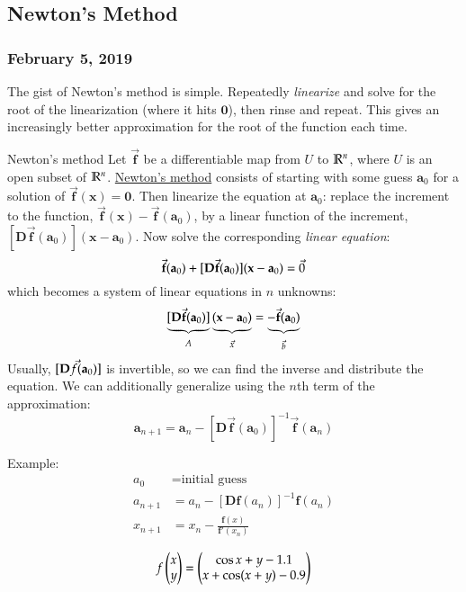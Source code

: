 \newpage
\subsection{Newton's Method}
\subsubsection*{February 5, 2019}

The gist of Newton's method is simple. Repeatedly \emph{linearize} and solve for the root of the linearization (where it hits $\bm{0}$), then rinse and repeat. This gives an increasingly better approximation for the root of the function each time. 

\begin{defn}{Newton's method}
Let $\vec{\bm{f}}$ be a differentiable map from $U$ to $\mathbb{R}^n$, where $U$ is an open subset of $\mathbb{R}^n$. \ul{Newton's method} consists of starting with some guess $\bm{a}_0$ for a solution of $\vec{\bm{f}}(\bm{x})=\bm{0}$. Then linearize the equation at $\bm{a}_0$: replace the increment to the function, $\vec{\bm{f}}(\bm{x})-\vec{\bm{f}}(\bm{a}_0)$, by a linear function of the increment, $[\bm{D}\vec{\bm{f}}(\bm{a}_0)](\bm{x}-\bm{a}_0)$. Now solve the corresponding \emph{linear equation}:
  \begin{equation}
  	\vec{\textbf{f}}(\textbf{a}_0)+[\textbf{D}\vec{\textbf{f}}(\textbf{a}_0)](\textbf{x}-\textbf{a}_0)=\Vec{0}
  \end{equation}
  which becomes a system of linear equations in $n$ unknowns: 
  \begin{equation}
  	\underbrace{[\textbf{D\ensuremath{\Vec{\textbf{f}}}}(\textbf{a}_0)]}_{A}\underbrace{(\textbf{x}-\textbf{a}_0)}_{\Vec{x}}=\underbrace{-\vec{\textbf{f}}(\textbf{a}_0)}_{\vec{b}}
  \end{equation}
  Usually, $[\textbf{D\ensuremath{\Vec{f}}}(\textbf{a}_0)]$ is invertible, so we can find the inverse and distribute the equation. We can additionally generalize using the $n$th term of the approximation:  
  \begin{equation}
  	\bm{a}_{n+1}=\bm{a}_n-[\bm{D}\vec{\bm{f}}(\bm{a}_0)]^{-1}\vec{\bm{f}}(\bm{a}_n)
  \end{equation}
\end{defn}

Example:
  \begin{align*}
    a_0 &= \text{initial guess} \\
    a_{n+1} &= a_n - [\bm{D}\bm{f}(a_n)]^{-1} \bm{f}(a_n) \\
    x_{n+1} &= x_n - \frac{\bm{f}(x)}{\bm{f}'(x_n)}
  \end{align*}


\example
\[f\begin{pmatrix} x \\ y \end{pmatrix} = \begin{pmatrix} \cos x + y - 1.1 \\  x + \cos (x + y) - 0.9 \end{pmatrix}\]
